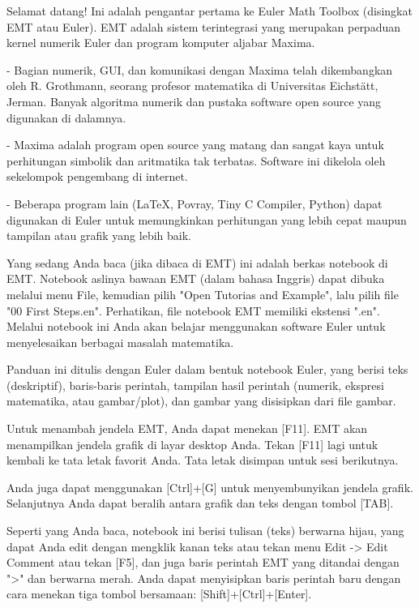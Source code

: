 \documentclass[a4paper,10pt]{article}
\begin{document}
\begin{eulernotebook}
\begin{eulercomment}
Selamat datang! Ini adalah pengantar pertama ke Euler Math Toolbox (disingkat EMT
atau Euler). EMT adalah sistem terintegrasi yang merupakan perpaduan kernel
numerik Euler dan program komputer aljabar Maxima.

- Bagian numerik, GUI, dan komunikasi dengan Maxima telah dikembangkan oleh R.
Grothmann, seorang profesor matematika di Universitas Eichstätt, Jerman. Banyak
algoritma numerik dan pustaka software open source yang digunakan di dalamnya.

- Maxima adalah program open source yang matang dan sangat kaya untuk perhitungan
simbolik dan aritmatika tak terbatas. Software ini dikelola oleh sekelompok
pengembang di internet.

- Beberapa program lain (LaTeX, Povray, Tiny C Compiler, Python) dapat digunakan
di Euler untuk memungkinkan perhitungan yang lebih cepat maupun tampilan atau
grafik yang lebih baik.

Yang sedang Anda baca (jika dibaca di EMT) ini adalah berkas notebook di EMT.
Notebook aslinya bawaan EMT (dalam bahasa Inggris) dapat dibuka melalui menu
File, kemudian pilih "Open Tutorias and Example", lalu pilih file "00 First
Steps.en". Perhatikan, file notebook EMT memiliki ekstensi ".en". Melalui
notebook ini Anda akan belajar menggunakan software Euler untuk menyelesaikan
berbagai masalah matematika.
\end{eulercomment}
\begin{eulercomment}
Panduan ini ditulis dengan Euler dalam bentuk notebook Euler, yang berisi teks
(deskriptif), baris-baris perintah, tampilan hasil perintah (numerik, ekspresi
matematika, atau gambar/plot), dan gambar yang disisipkan dari file gambar.

Untuk menambah jendela EMT, Anda dapat menekan [F11]. EMT akan menampilkan
jendela grafik di layar desktop Anda. Tekan [F11] lagi untuk kembali ke tata
letak favorit Anda. Tata letak disimpan untuk sesi berikutnya.

Anda juga dapat menggunakan [Ctrl]+[G] untuk menyembunyikan jendela grafik.
Selanjutnya Anda dapat beralih antara grafik dan teks dengan tombol [TAB].

Seperti yang Anda baca, notebook ini berisi tulisan (teks) berwarna hijau, yang
dapat Anda edit dengan mengklik kanan teks atau tekan menu Edit -\textgreater{} Edit Comment
atau tekan [F5], dan juga baris perintah EMT yang ditandai dengan "\textgreater{}" dan
berwarna merah. Anda dapat menyisipkan baris perintah baru dengan cara menekan
tiga tombol bersamaan: [Shift]+[Ctrl]+[Enter].


\end{eulercomment}
\end{eulernotebook}
\end{document}
